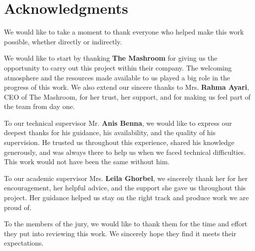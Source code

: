 \section*{Acknowledgments}

We would like to take a moment to thank everyone who helped make this work possible, whether directly or indirectly.

\vspace{0.8cm}

We would like to start by thanking \textbf{The Mashroom} for giving us the opportunity to carry out this project within their company. The welcoming atmosphere and the resources made available to us played a big role in the progress of this work. We also extend our sincere thanks to Mrs. \textbf{Rahma Ayari}, CEO of The Mashroom, for her trust, her support, and for making us feel part of the team from day one.

\vspace{0.8cm}

To our technical supervisor Mr. \textbf{Anis Benna}, we would like to express our deepest thanks for his guidance, his availability, and the quality of his supervision. He trusted us throughout this experience, shared his knowledge generously, and was always there to help us when we faced technical difficulties. This work would not have been the same without him.

\vspace{0.8cm}

To our academic supervisor Mrs. \textbf{Leila Ghorbel}, we sincerely thank her for her encouragement, her helpful advice, and the support she gave us throughout this project. Her guidance helped us stay on the right track and produce work we are proud of.

\vspace{0.8cm}

To the members of the jury, we would like to thank them for the time and effort they put into reviewing this work. We sincerely hope they find it meets their expectations.

\newpage
